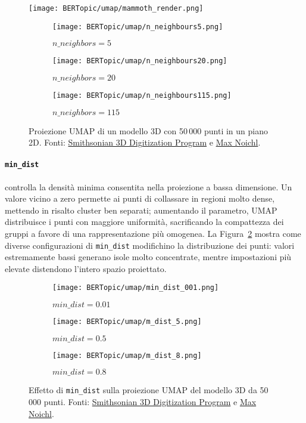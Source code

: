 \begin{figure}[H]
\centering
\texttt{[image: BERTopic/umap/mammoth\_render.png]}

\begin{subfigure}{0.32\textwidth}
    \centering
    \texttt{[image: BERTopic/umap/n\_neighbours5.png]}
    \caption{$n\_neighbors = 5$}
\end{subfigure}\hfill
\begin{subfigure}{0.32\textwidth}
    \centering
    \texttt{[image: BERTopic/umap/n\_neighbours20.png]}
    \caption{$n\_neighbors = 20$}
\end{subfigure}\hfill
\begin{subfigure}{0.32\textwidth}
    \centering
    \texttt{[image: BERTopic/umap/n\_neighbours115.png]}
    \caption{$n\_neighbors = 115$}
\end{subfigure}
\caption{Proiezione UMAP di un modello 3D con 50\,000 punti in un piano 2D. Fonti: \href{https://3d.si.edu/object/3d/mammuthus-primigenius-blumbach:341c96cd-f967-4540-8ed1-d3fc56d31f12}{Smithsonian 3D Digitization Program} e \href{https://www.maxnoichl.eu/projects/mammoth/}{Max Noichl}.}
\label{fig:umap-mammoth}
\end{figure}
\paragraph{\texttt{min\_dist}} controlla la densità minima consentita nella proiezione a bassa dimensione. Un valore vicino a zero permette ai punti di collassare in regioni molto dense, mettendo in risalto cluster ben separati; aumentando il parametro, UMAP distribuisce i punti con maggiore uniformità, sacrificando la compattezza dei gruppi a favore di una rappresentazione più omogenea. La Figura~\ref{fig:umap-min-dist} mostra come diverse configurazioni di \texttt{min\_dist} modifichino la distribuzione dei punti: valori estremamente bassi generano isole molto concentrate, mentre impostazioni più elevate distendono l'intero spazio proiettato.
\begin{figure}[H]
\centering

\begin{subfigure}{0.32\textwidth}
    \centering
    \texttt{[image: BERTopic/umap/min\_dist\_001.png]}
    \caption{$min\_dist = 0.01$}
\end{subfigure}\hfill
\begin{subfigure}{0.32\textwidth}
    \centering
    \texttt{[image: BERTopic/umap/m\_dist\_5.png]}
    \caption{$min\_dist = 0.5$}
\end{subfigure}\hfill
\begin{subfigure}{0.32\textwidth}
    \centering
    \texttt{[image: BERTopic/umap/m\_dist\_8.png]}
    \caption{$min\_dist = 0.8$}
\end{subfigure}
\caption{Effetto di \texttt{min\_dist} sulla proiezione UMAP del modello 3D da 50\,000 punti. Fonti: \href{https://3d.si.edu/object/3d/mammuthus-primigenius-blumbach:341c96cd-f967-4540-8ed1-d3fc56d31f12}{Smithsonian 3D Digitization Program} e \href{https://www.maxnoichl.eu/projects/mammoth/}{Max Noichl}.}
\label{fig:umap-min-dist}
\end{figure}
